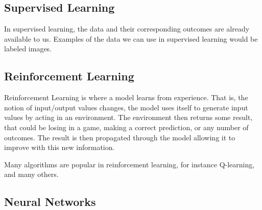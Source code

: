 

\subsection{Supervised Learning}

In supervised learning, the data and their corresponding outcomes are already available to us. Examples of the data we can use in supervised learning would be labeled images.

\subsection{Reinforcement Learning}

Reinforcement Learning is where a model learns from experience. That is, the notion of input/output values changes, the model uses itself to generate input values by acting in an environment. The environment then returns some result, that could be losing in a game, making a correct prediction, or any number of outcomes. The result is then propagated through the model allowing it to improve with this new information.

Many algorithms are popular in reinforcement learning, for instance Q-learning\cite{qlearning:watkins}, and many others.

\subsection{Neural Networks}

